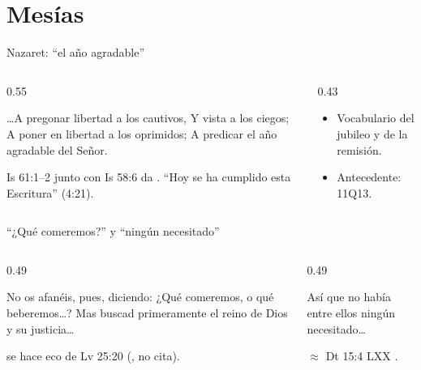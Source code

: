 \section{Mesías}

\begin{frame}{Nazaret: ``el año agradable''}
\begin{columns}[c,onlytextwidth]
\begin{column}{0.55\textwidth}
\begin{cita}\ldots{}A pregonar libertad a los cautivos, Y vista a los ciegos; A poner en libertad a los oprimidos; A predicar el año agradable del Señor.\end{cita}
\scriptsize Is 61:1--2 junto con Is 58:6 da  . ``Hoy se ha cumplido esta Escritura'' (4:21).
\end{column}
\begin{column}{0.43\textwidth}\small
\begin{itemize}
\item Vocabulario del jubileo y de la remisión.
\item Antecedente: 11Q13.
\end{itemize}
\end{column}
\end{columns}
\end{frame}

\begin{frame}{``¿Qué comeremos?'' y ``ningún necesitado''}
\begin{columns}[t,onlytextwidth]
\begin{column}{0.49\textwidth}
\begin{cita}No os afanéis, pues, diciendo: ¿Qué comeremos, o qué beberemos\ldots? Mas buscad primeramente el reino de Dios y su justicia\ldots{}\end{cita}
\scriptsize {} se hace eco de Lv 25:20 (, no cita).
\end{column}
\begin{column}{0.49\textwidth}
\begin{cita}Así que no había entre ellos ningún necesitado\ldots{}\end{cita}
\scriptsize {} $\approx$ Dt 15:4 LXX .\par
{}
\end{column}
\end{columns}
\end{frame}

